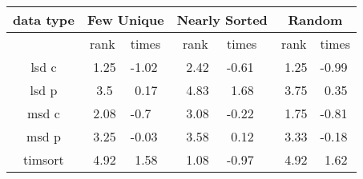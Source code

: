 \documentclass[12pt]{article}
\begin{document}
	\begin{table}[h]
		\centering
		\begin{tabular}{c|cl|cl|cl}
			\toprule
			\multicolumn{1}{c}{data type} & \multicolumn{2}{c}{Few Unique} & \multicolumn{2}{c}{Nearly Sorted} & \multicolumn{2}{c}{Random} \\
			\midrule
			\multicolumn{1}{c}{} & rank & times & rank & times & rank & times \\
			\midrule
			lsd c  & \,\,1.25  & -1.02  & \,\,2.42  & -0.61  & \,\,1.25  & -0.99 \\
			lsd p  & \,\,3.5  & \,\,0.17  & \,\,4.83  & \,\,1.68  & \,\,3.75  & \,\,0.35 \\
			msd c  & \,\,2.08  & -0.7  & \,\,3.08  & -0.22  & \,\,1.75  & -0.81 \\
			msd p  & \,\,3.25  & -0.03  & \,\,3.58  & \,\,0.12  & \,\,3.33  & -0.18 \\
			timsort  & \,\,4.92  & \,\,1.58  & \,\,1.08  & -0.97  & \,\,4.92  & \,\,1.62 \\
			\bottomrule
			\end{tabular}
		
			\label{fig:datatype}
	\end{table}

	
	
	
\pagebreak
\printbibliography
\end{document}
